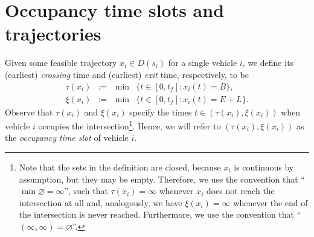 \documentclass[a4paper]{report}
\theoremstyle{definition}
\theoremstyle{plain}
\begin{document}
\section{Occupancy time slots and trajectories}\label{sec:decomposition}

 
Given some feasible trajectory $x_{i} \in D(s_{i})$ for a single vehicle $i$, we
define its (earliest) \emph{crossing} time and (earliest) \emph{exit} time,
respectively, to be
%
\begin{subequations}
\begin{alignat}{2}
  \tau(x_{i}) &:=& \, \min &\{ t \in [0, t_{f}] : x_{i}(t) = B \} , \\
  \xi(x_{i}) &:=& \, \min &\{ t \in [0, t_{f}] : x_{i}(t) = E + L \} .
\end{alignat}
\end{subequations}
%
Observe that $\tau(x_{i})$ and $\xi(x_{i})$ specify the times
$t \in (\tau(x_{i}), \xi(x_{i}))$ when vehicle $i$ occupies the
intersection\footnote{%
  Note that the sets in the definition are closed, because $x_{i}$ is continuous
  by assumption, but they may be empty. Therefore, we use the convention that
  ``$\min \varnothing = \infty$'', such that $\tau(x_{i}) = \infty$ whenever
  $x_{i}$ does not reach the intersection at all and, analogously, we have
  $\xi(x_{i}) = \infty$ whenever the end of the intersection is never reached.
  Furthermore, we use the convention that
  ``$(\infty, \infty) = \varnothing$''.}. Hence, we will refer to
$(\tau(x_i), \xi(x_i))$ as the \emph{occupancy time slot} of vehicle $i$.
\end{document}
